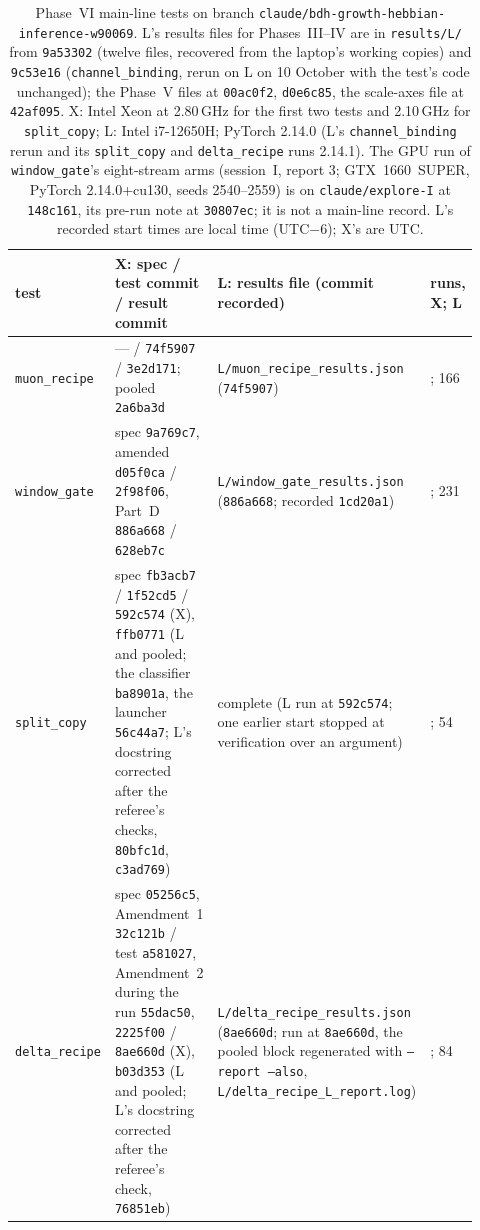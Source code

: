 \documentclass[11pt]{article}
\begin{document}
\begin{table}[H]
\centering
\footnotesize
\begin{tabular}{@{}>{\raggedright\arraybackslash}p{0.15\linewidth}>{\raggedright\arraybackslash}p{0.4\linewidth}>{\raggedright\arraybackslash}p{0.28\linewidth}>{\raggedright\arraybackslash}p{0.09\linewidth}@{}}
\toprule
test & X: spec / test commit / result commit & L: results file (commit recorded) & runs, X; L\\
\midrule
\texttt{muon\_recipe} & --- / \texttt{74f5907} / \texttt{3e2d171}; pooled \texttt{2a6ba3d} & \texttt{L/muon\_recipe\_results.json} (\texttt{74f5907}) & 156; 166\\
\texttt{window\_gate} & spec \texttt{9a769c7}, amended \texttt{d05f0ca} / \texttt{2f98f06}, Part~D \texttt{886a668} / \texttt{628eb7c} & \texttt{L/window\_gate\_results.json} (\texttt{886a668}; recorded \texttt{1cd20a1}) & 231; 231\\
\texttt{split\_copy} & spec \texttt{fb3acb7} / \texttt{1f52cd5} / \texttt{592c574} (X), \texttt{ffb0771} (L and pooled; the classifier \texttt{ba8901a}, the launcher \texttt{56c44a7}; L's docstring corrected after the referee's checks, \texttt{80bfc1d}, \texttt{c3ad769}) & complete (L run at \texttt{592c574}; one earlier start stopped at verification over an argument) & 54; 54\\
\texttt{delta\_recipe} & spec \texttt{05256c5}, Amendment~1 \texttt{32c121b} / test \texttt{a581027}, Amendment~2 during the run \texttt{55dac50}, \texttt{2225f00} / \texttt{8ae660d} (X), \texttt{b03d353} (L and pooled; L's docstring corrected after the referee's check, \texttt{76851eb}) & \texttt{L/delta\_recipe\_results.json} (\texttt{8ae660d}; run at \texttt{8ae660d}, the pooled block regenerated with \texttt{--report --also}, \texttt{L/delta\_recipe\_L\_report.log}) & 84; 84\\
\bottomrule
\end{tabular}
\caption{Phase~VI main-line tests on branch \texttt{claude/bdh-growth-hebbian-inference-w90069}. L's results files for Phases~III--IV are in \texttt{results/L/} from \texttt{9a53302} (twelve files, recovered from the laptop's working copies) and \texttt{9c53e16} (\texttt{channel\_binding}, rerun on L on 10 October with the test's code unchanged); the Phase~V files at \texttt{00ac0f2}, \texttt{d0e6c85}, the scale-axes file at \texttt{42af095}. X: Intel Xeon at 2.80\,GHz for the first two tests and 2.10\,GHz for \texttt{split\_copy}; L: Intel i7-12650H; PyTorch 2.14.0 (L's \texttt{channel\_binding} rerun and its \texttt{split\_copy} and \texttt{delta\_recipe} runs 2.14.1). The GPU run of \texttt{window\_gate}'s eight-stream arms (session~I, report 3; GTX~1660~SUPER, PyTorch 2.14.0+cu130, seeds 2540--2559) is on \texttt{claude/explore-I} at \texttt{148c161}, its pre-run note at \texttt{30807ec}; it is not a main-line record. L's recorded start times are local time (UTC$-$6); X's are UTC.}
\label{tab:prov}
\end{table}
\end{document}
